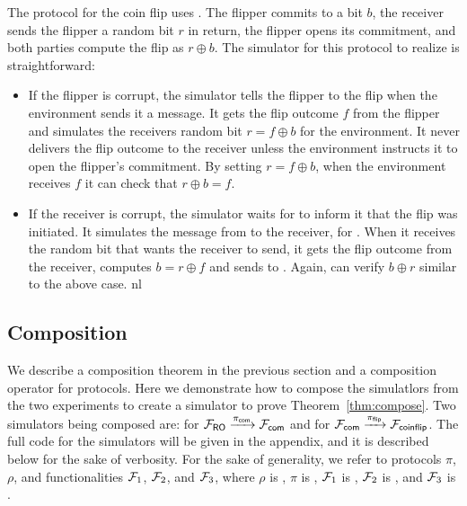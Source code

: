 The protocol for the coin flip uses \Fcom. 
The flipper commits to a bit $b$, the receiver sends the flipper a random bit $r$ in return, the flipper opens its commitment, and both parties compute the flip as $r \oplus b$.
The simulator for this protocol to realize \Fflip is straightforward:
\begin{itemize}
\item If the flipper is corrupt, the simulator tells the flipper to  the flip when the environment sends it a  message. It gets the flip outcome $f$ from the flipper and simulates the receivers random bit $r = f \oplus b$ for the environment. It never delivers the flip outcome to the receiver unless the environment instructs it to open the flipper's commitment. By setting $r = f \oplus b$, when the environment receives $f$ it can check that $r \oplus b = f$.
\item If the receiver is corrupt, the simulator waits for \Fflip to inform it that the flip was initiated. It simulates the  message from \Fcom to the receiver, for \Z. When it receives the random bit that \Z wants the receiver to send, it gets the flip outcome from the receiver, computes $b = r \oplus f$ and sends  to \Z. Again, \Z can verify $b \oplus r$ similar to the above case.
nl
\end{itemize}

\subsection{Composition}
We describe a composition theorem in the previous section and a composition operator for protocols.
Here we demonstrate how to compose the simulatlors from the two experiments to create a simulator to prove Theorem~\ref{thm:compose}.
Two simulators being composed are:  for $\mathcal{F}_{{\mathsf {RO}}} \xrightarrow{\pi_{{\mathsf {com}}}} \mathcal{F}_{{\mathsf {com}}}$ and  for $\mathcal{F}_{{\mathsf {com}}} \xrightarrow{\pi_{{\mathsf {flip}}}} \mathcal{F}_{{\mathsf {coinflip}}}$. 
The full code for the simulators will be given in the appendix, and it is described below for the sake of verbosity.
For the sake of generality, we refer to protocols $\pi$, $\rho$, and functionalities $\mathcal{F}_1$, $\mathcal{F}_2$, and $\mathcal{F}_3$, where $\rho$ is , $\pi$ is , $\mathcal{F}_1$ is \Fro, $\mathcal{F}_2$ is \Fcom, and $\mathcal{F}_3$ is \Fflip.

